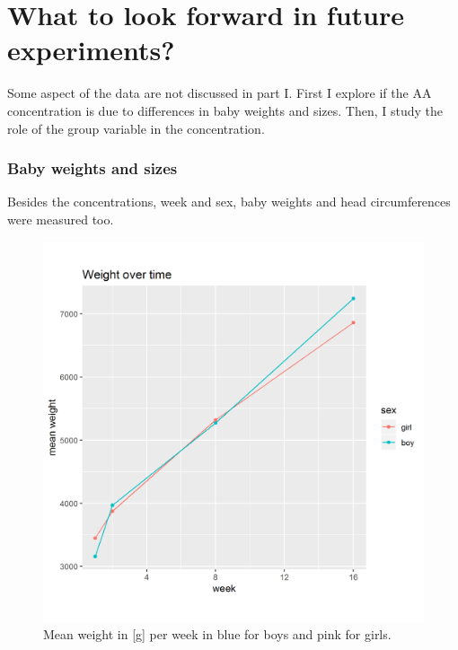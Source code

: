 \documentclass[12pt]{article}
\begin{document}
\clearpage

\part{What to look forward in future experiments?}

Some aspect of the data are not discussed in part I. First I explore if the AA concentration is due to differences in baby weights and sizes. Then, I study the role of the group variable in the concentration.


\section{Baby weights and sizes}

Besides the concentrations, week and sex, baby weights and head circumferences were measured too.

\begin{figure}[!htb]
  \centering
  \includegraphics[width=\textwidth]{../wANDhc/weight.png}
  \caption{Mean weight in [g] per week in blue for boys and pink for girls.}
  \label{fig:weight}
\end{figure}
\end{document}
